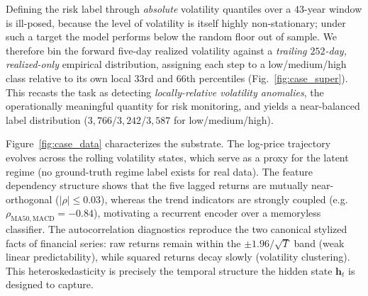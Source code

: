 Defining the risk label through \emph{absolute} volatility quantiles over a
$43$-year window is ill-posed, because the level of volatility is itself highly
non-stationary; under such a target the model performs below the random floor
out of sample. We therefore bin the forward five-day realized volatility against
a \emph{trailing $252$-day, realized-only} empirical distribution, assigning
each step to a low/medium/high class relative to its own local $33$rd and
$66$th percentiles (Fig.~\ref{fig:case_super}). This
recasts the task as detecting \emph{locally-relative volatility anomalies}, the
operationally meaningful quantity for risk monitoring, and yields a near-balanced
label distribution ($3{,}766$/$3{,}242$/$3{,}587$ for low/medium/high).

Figure~\ref{fig:case_data} characterizes the substrate. The log-price trajectory
 evolves across the rolling volatility states, which serve
as a proxy for the latent regime (no ground-truth regime label exists for real
data). The feature dependency structure  shows that the
five lagged returns are mutually near-orthogonal ($|\rho|\!\le\!0.03$), whereas
the trend indicators are strongly coupled (e.g.\ $\rho_{\mathrm{MA50,MACD}} =
-0.84$), motivating a recurrent encoder over a memoryless classifier. The
autocorrelation diagnostics reproduce the two canonical stylized facts of
financial series: raw returns  remain within the
$\pm 1.96/\sqrt{T}$ band (weak linear predictability), while squared returns
 decay slowly (volatility clustering). This
heteroskedasticity is precisely the temporal structure the hidden state
$\bm{h}_t$ is designed to capture.

